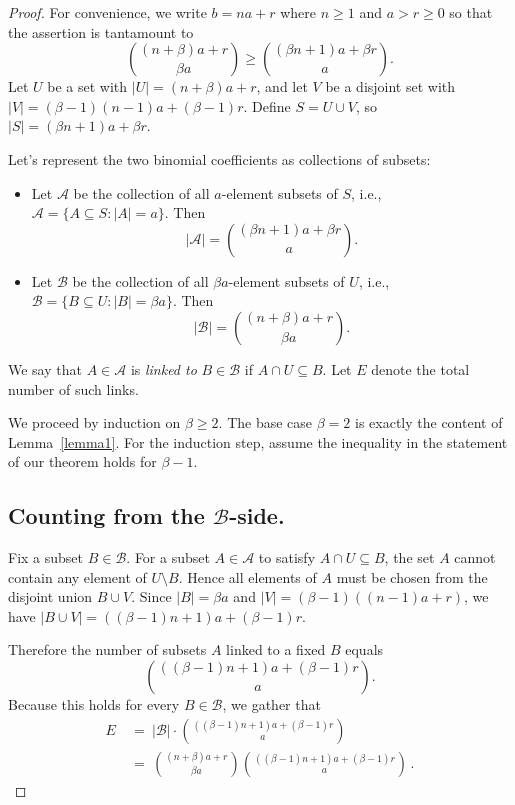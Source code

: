 \documentclass[11pt]{amsart}
\begin{document}
\begin{proof} For convenience, we write $b=na+r$ where $n\geq1$ and $a>r\geq0$ so that the assertion is tantamount to
$$ \binom{(n+\beta)a+r}{\beta a} \ge \binom{(\beta n+1)a+\beta r}{a}.$$
 Let $U$ be a set with $|U| = (n+\beta)a+r$, and let $V$ be a disjoint set with $|V| = (\beta-1)(n-1)a+(\beta-1)r$. Define $S = U \cup V$, so $|S| = (\beta n+1)a+\beta r$. 

Let's represent the two binomial coefficients as collections of subsets:

\begin{itemize}
    \item Let $\mathcal{A}$ be the collection of all $a$-element subsets of $S$, i.e., $\mathcal{A} = \{ A \subseteq S : |A| = a \}$. Then
    $$
    |\mathcal{A}|=\binom{(\beta n+1)a+\beta r}{a}.
    $$

    \item Let $\mathcal{B}$ be the collection of all $\beta a$-element subsets of $U$, i.e., $\mathcal B = \{ B \subseteq U : |B| = \beta a \}$. Then
    $$
    |\mathcal{B}|=\binom{(n+\beta)a+r}{\beta a}.
    $$
\end{itemize}
We say that $A\in\mathcal{A}$ is \emph{linked to} $B\in\mathcal{B}$ if $A\cap U \subseteq B$.
Let $E$ denote the total number of such links.

We proceed by induction on $\beta\geq2$. The base case $\beta=2$ is exactly the content of Lemma~\ref{lemma1}. 
For the induction step, assume the inequality in the statement of our theorem holds for $\beta - 1$.

\subsection*{Counting from the $\mathcal{B}$-side.}

Fix a subset $B\in\mathcal{B}$. For a subset $A\in\mathcal{A}$ to satisfy $A\cap U\subseteq B$, the set $A$ cannot contain any element of $U\setminus B$. Hence all elements of $A$ must be chosen from the disjoint union $B\cup V$. Since $|B|=\beta a$ and $|V|=(\beta-1)((n-1)a+r)$, we have $|B\cup V|=((\beta-1)n+1)a+(\beta-1)r$.

Therefore the number of subsets $A$ linked to a fixed $B$ equals
$$
\binom{((\beta-1)n+1)a+(\beta-1)r}a.
$$
Because this holds for every $B\in\mathcal{B}$, we gather that
\begin{align*}
E  \ &= \ |\mathcal{B}|\cdot \binom{((\beta-1)n+1)a+(\beta-1)r}a \\ 
&= \ \binom{(n+\beta)a+r}{\beta a} \binom{((\beta-1)n+1)a+(\beta-1)r}a \, .
\end{align*}


\end{proof}
\end{document}
